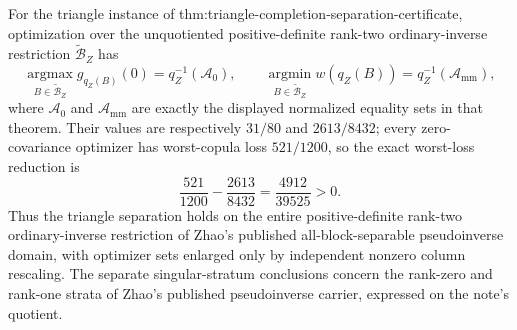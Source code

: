 For the triangle instance of thm:triangle-completion-separation-certificate, optimization over the unquotiented positive-definite rank-two ordinary-inverse restriction \(\widetilde{\mathcal B}_Z\) has
\[
\operatorname*{argmax}_{B\in\widetilde{\mathcal B}_Z}g_{q_Z(B)}(0)=q_Z^{-1}(\mathcal A_0),
\qquad
\operatorname*{argmin}_{B\in\widetilde{\mathcal B}_Z}w(q_Z(B))=q_Z^{-1}(\mathcal A_{\mathrm{mm}}),
\]
where \(\mathcal A_0\) and \(\mathcal A_{\mathrm{mm}}\) are exactly the displayed normalized equality sets in that theorem.  Their values are respectively \(31/80\) and \(2613/8432\); every zero-covariance optimizer has worst-copula loss \(521/1200\), so the exact worst-loss reduction is
\[
\frac{521}{1200}-\frac{2613}{8432}=\frac{4912}{39525}>0.
\]
Thus the triangle separation holds on the entire positive-definite rank-two ordinary-inverse restriction of Zhao's published all-block-separable pseudoinverse domain, with optimizer sets enlarged only by independent nonzero column rescaling.  The separate singular-stratum conclusions concern the rank-zero and rank-one strata of Zhao's published pseudoinverse carrier, expressed on the note's quotient.